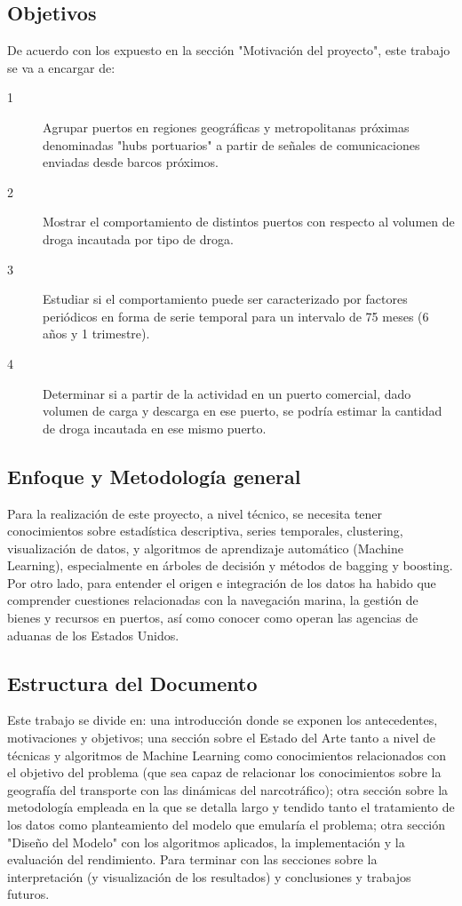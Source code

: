 \documentclass[12pt]{article}
\begin{document}
	\subsection{Objetivos}
	De acuerdo con los expuesto en la sección "Motivación del proyecto", este trabajo se va a encargar de:
	
	\begin{description}
		\item[1] Agrupar puertos en regiones geográficas y metropolitanas próximas denominadas "hubs portuarios" a partir de señales de comunicaciones enviadas desde barcos próximos.
		\item[2] Mostrar el comportamiento de distintos puertos con respecto al volumen de droga incautada por tipo de droga.
		\item[3] Estudiar si el comportamiento puede ser caracterizado por factores periódicos en forma de serie temporal para un intervalo de 75 meses (6 años y 1 trimestre).
		\item[4] Determinar si a partir de la actividad en un puerto comercial, dado volumen de carga y descarga en ese puerto, se podría estimar la cantidad de droga incautada en ese mismo puerto.
	\end{description}

	\subsection{Enfoque y Metodología general}
	Para la realización de este proyecto, a nivel técnico, se necesita tener conocimientos sobre estadística descriptiva, series temporales, clustering, visualización de datos, y algoritmos de aprendizaje automático (Machine Learning), especialmente en árboles de decisión y métodos de bagging y boosting. Por otro lado, para entender el origen e integración de los datos ha habido que comprender cuestiones relacionadas con la navegación marina, la gestión de bienes y recursos en puertos, así como conocer como operan las agencias de aduanas de los Estados Unidos.

	\subsection{Estructura del Documento}
	Este trabajo se divide en: una introducción donde se exponen los antecedentes, motivaciones y objetivos; una sección sobre el Estado del Arte tanto a nivel de técnicas y algoritmos de Machine Learning como conocimientos relacionados con el objetivo del problema (que sea capaz de relacionar los conocimientos sobre la geografía del transporte con las dinámicas del narcotráfico); otra sección sobre la metodología empleada en la que se detalla largo y tendido tanto el tratamiento de los datos como planteamiento del modelo que emularía el problema; otra sección "Diseño del Modelo" con los algoritmos aplicados, la implementación y la evaluación del rendimiento. Para terminar con las secciones sobre la interpretación (y visualización de los resultados) y conclusiones y trabajos futuros.
\end{document}
